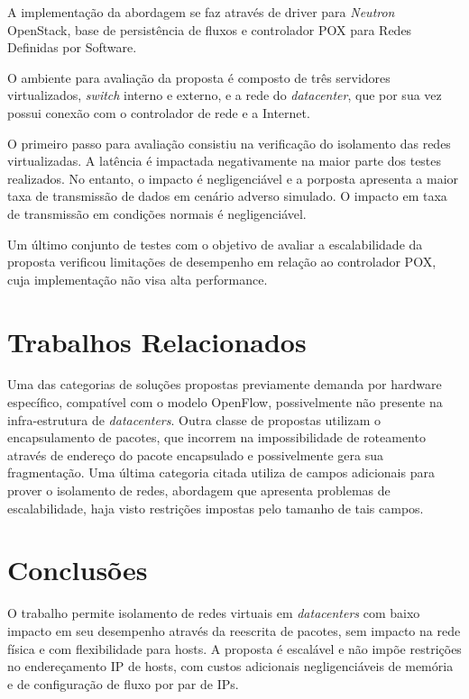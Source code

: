 A implementação da abordagem se faz através de driver para \textit{Neutron} OpenStack, base de persistência de fluxos e controlador POX para Redes Definidas por Software.

O ambiente para avaliação da proposta é composto de três servidores virtualizados, \textit{switch} interno e externo, e a rede do \textit{datacenter}, que por sua vez possui conexão com o controlador de rede e a Internet.

O primeiro passo para avaliação consistiu na verificação do isolamento das redes virtualizadas. A latência é impactada negativamente na maior parte dos testes realizados. No entanto, o impacto é negligenciável e a porposta apresenta a maior taxa de transmissão de dados em cenário adverso simulado. O impacto em taxa de transmissão em condições normais é negligenciável.

Um último conjunto de testes com o objetivo de avaliar a escalabilidade da proposta verificou limitações de desempenho em relação ao controlador POX, cuja implementação não visa alta performance.


\section*{Trabalhos Relacionados}

Uma das categorias de soluções propostas previamente demanda por hardware específico, compatível com o modelo OpenFlow, possivelmente não presente na infra-estrutura de \textit{datacenters}.
Outra classe de propostas utilizam o encapsulamento de pacotes, que incorrem na impossibilidade de roteamento através de endereço do pacote encapsulado e possivelmente gera sua fragmentação.
Uma última categoria citada utiliza de campos adicionais para prover o isolamento de redes, abordagem que apresenta problemas de escalabilidade, haja visto restrições impostas pelo tamanho de tais campos.


\section*{Conclusões}

O trabalho permite isolamento de redes virtuais em \textit{datacenters} com baixo impacto em seu desempenho através da reescrita de pacotes, sem impacto na rede física e com flexibilidade para hosts.
A proposta é escalável e não impõe restrições no endereçamento IP de hosts, com custos adicionais negligenciáveis de memória e de configuração de fluxo por par de IPs.

